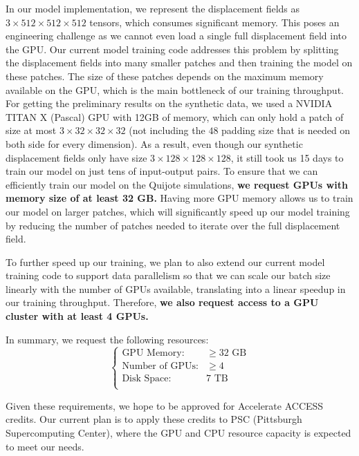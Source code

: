 \documentclass[10pt]{article}
\begin{document}
In our model implementation, we represent the displacement fields as $3 \times 512 \times 512 \times 512$ tensors, which consumes significant memory. This poses an engineering challenge as we cannot even load a single full displacement field into the GPU. Our current model training code addresses this problem by splitting the displacement fields into many smaller patches and then training the model on these patches. The size of these patches depends on the maximum memory available on the GPU, which is the main bottleneck of our training throughput. For getting the preliminary results on the synthetic data, we used a NVIDIA TITAN X (Pascal) GPU with 12GB of memory, which can only hold a patch of size at most $3 \times 32 \times 32 \times 32$ (not including the $48$ padding size that is needed on both side for every dimension). As a result, even though our synthetic displacement fields only have size $3 \times 128 \times 128 \times 128$, it still took us 15 days to train our model on just tens of input-output pairs. To ensure that we can efficiently train our model on the Quijote simulations, \textbf{we request GPUs with memory size of at least 32 GB.} Having more GPU memory allows us to train our model on larger patches, which will significantly speed up our model training by reducing the number of patches needed to iterate over the full displacement field.

To further speed up our training, we plan to also extend our current model training code to support data parallelism so that we can scale our batch size linearly with the number of GPUs available, translating into a linear speedup in our training throughput. Therefore, \textbf{we also request access to a GPU cluster with at least 4 GPUs.}

In summary, we request the following resources:
$$
\begin{cases}
  \text{GPU Memory:} & \geq 32 \text{ GB} \\
  \text{Number of GPUs:} & \geq 4 \\
  \text{Disk Space:} & 7 \text{ TB} \\
\end{cases}
$$

Given these requirements, we hope to be approved for Accelerate ACCESS credits. Our current plan is to apply these credits to PSC (Pittsburgh Supercomputing Center), where the GPU and CPU resource capacity is expected to meet our needs.

\pagebreak

\printbibliography
\end{document}

